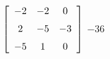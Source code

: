{$\left[ \begin {array}{ccc} -2&-2&0\\\noalign{\medskip}2&-5&-3
\\\noalign{\medskip}-5&1&0\end {array} \right]$} 
{$-36$}



  


